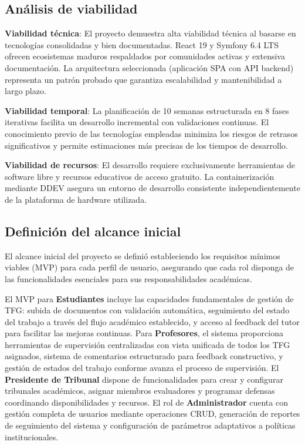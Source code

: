 \documentclass[12pt,a4paper,oneside]{report}
\begin{document}
\subsection{Análisis de viabilidad}\label{anuxe1lisis-de-viabilidad}

\textbf{Viabilidad técnica}: El proyecto demuestra alta viabilidad técnica al basarse en tecnologías consolidadas y bien documentadas. React 19 y Symfony 6.4 LTS ofrecen ecosistemas maduros respaldados por comunidades activas y extensiva documentación. La arquitectura seleccionada (aplicación SPA con API backend) representa un patrón probado que garantiza escalabilidad y mantenibilidad a largo plazo.

\textbf{Viabilidad temporal}: La planificación de 10 semanas estructurada en 8 fases iterativas facilita un desarrollo incremental con validaciones continuas. El conocimiento previo de las tecnologías empleadas minimiza los riesgos de retrasos significativos y permite estimaciones más precisas de los tiempos de desarrollo.

\textbf{Viabilidad de recursos}: El desarrollo requiere exclusivamente herramientas de software libre y recursos educativos de acceso gratuito. La containerización mediante DDEV asegura un entorno de desarrollo consistente independientemente de la plataforma de hardware utilizada.

\subsection{Definición del alcance
inicial}\label{definiciuxf3n-del-alcance-inicial}

El alcance inicial del proyecto se definió estableciendo los requisitos mínimos viables (MVP) para cada perfil de usuario, asegurando que cada rol disponga de las funcionalidades esenciales para sus responsabilidades académicas.

El MVP para \textbf{Estudiantes} incluye las capacidades fundamentales de gestión de TFG: subida de documentos con validación automática, seguimiento del estado del trabajo a través del flujo académico establecido, y acceso al feedback del tutor para facilitar las mejoras continuas. Para \textbf{Profesores}, el sistema proporciona herramientas de supervisión centralizadas con vista unificada de todos los TFG asignados, sistema de comentarios estructurado para feedback constructivo, y gestión de estados del trabajo conforme avanza el proceso de supervisión. El \textbf{Presidente de Tribunal} dispone de funcionalidades para crear y configurar tribunales académicos, asignar miembros evaluadores y programar defensas coordinando disponibilidades y recursos. El rol de \textbf{Administrador} cuenta con gestión completa de usuarios mediante operaciones CRUD, generación de reportes de seguimiento del sistema y configuración de parámetros adaptativos a políticas institucionales.
\end{document}
